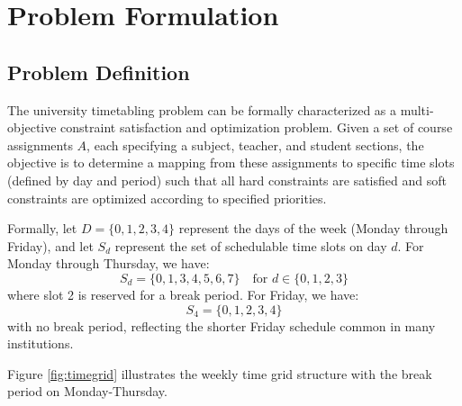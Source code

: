 \documentclass[12pt,a4paper]{article}
\begin{document}
\section{Problem Formulation}

\subsection{Problem Definition}

The university timetabling problem can be formally characterized as a multi-objective constraint satisfaction and optimization problem. Given a set of course assignments $A$, each specifying a subject, teacher, and student sections, the objective is to determine a mapping from these assignments to specific time slots (defined by day and period) such that all hard constraints are satisfied and soft constraints are optimized according to specified priorities.

Formally, let $D = \{0, 1, 2, 3, 4\}$ represent the days of the week (Monday through Friday), and let $S_d$ represent the set of schedulable time slots on day $d$. For Monday through Thursday, we have:
\begin{equation}
S_d = \{0, 1, 3, 4, 5, 6, 7\} \quad \text{for } d \in \{0, 1, 2, 3\}
\end{equation}
where slot 2 is reserved for a break period. For Friday, we have:
\begin{equation}
S_4 = \{0, 1, 2, 3, 4\}
\end{equation}
with no break period, reflecting the shorter Friday schedule common in many institutions.

Figure \ref{fig:timegrid} illustrates the weekly time grid structure with the break period on Monday-Thursday.
\end{document}
